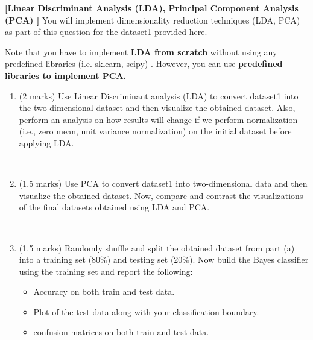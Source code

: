 \documentclass[addpoints,12pt,solution]{exam}
\begin{document}
\begin{questions}


\question \textbf{[Linear Discriminant Analysis (LDA), Principal Component Analysis (PCA) ]} You will implement dimensionality reduction techniques (LDA, PCA) as part of this question for the dataset1 provided \href{https://drive.google.com/drive/folders/1uVdd8J0BhtuJ6r_93N70zASaRmcoyKiz?usp=sharing}{here}.

Note that you have to implement \textbf{LDA from scratch} without using any predefined libraries (i.e. sklearn, scipy) . However,  you can use \textbf{predefined libraries to implement PCA.}

\begin{enumerate}[label=(\alph*)]

\item (2 marks) Use Linear Discriminant analysis (LDA) to convert dataset1 into the two-dimensional dataset and then visualize the obtained  dataset. Also, perform an analysis on how results will change if we perform normalization (i.e., zero mean, unit variance normalization) on the initial dataset before applying LDA.


\begin{solution}\\

\end{solution}

\item (1.5 marks) Use PCA to convert dataset1 into two-dimensional data and then visualize the obtained dataset. Now, compare and contrast the visualizations of the final datasets obtained using LDA and PCA.   



\begin{solution}\\

\end{solution}


\item (1.5 marks) Randomly shuffle and split the obtained dataset from part (a) into a training set (80$\%$) and testing set (20$\%$).  Now build the Bayes classifier using the training set and report the following:

\begin{itemize}
\item Accuracy on both train and test data.
  \item Plot of the test data along with your classification boundary.
  \item confusion matrices on both train and test data.
\end{itemize}


\end{enumerate}
\end{questions}
\end{document}

